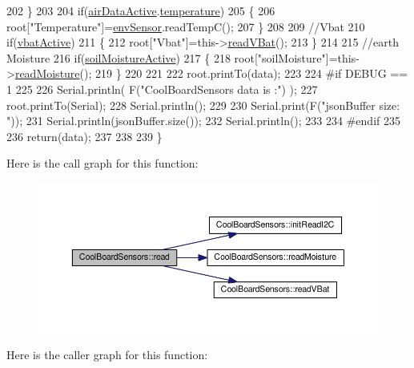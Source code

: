 \begin{DoxyCode}
202     \}   
203     
204     \textcolor{keywordflow}{if}(\hyperlink{classCoolBoardSensors_abff8dfeccb2f7689847bb64d5f1cd31e}{airDataActive}.\hyperlink{structCoolBoardSensors_1_1airActive_a9a6633c426b0508e30ebc1832ec6d745}{temperature})
205     \{
206         root[\textcolor{stringliteral}{"Temperature"}]=\hyperlink{classCoolBoardSensors_a868e38985e9a2412829fa2790ca13e2e}{envSensor}.readTempC();
207     \}
208     
209     \textcolor{comment}{//Vbat}
210     \textcolor{keywordflow}{if}(\hyperlink{classCoolBoardSensors_af5039ad760b0ff0aa7eee16c55e81702}{vbatActive})    
211     \{   
212         root[\textcolor{stringliteral}{"Vbat"}]=this->\hyperlink{classCoolBoardSensors_a6944b6ea7bce8e2fce1b434acfd9d5f3}{readVBat}();
213     \}
214     
215     \textcolor{comment}{//earth Moisture}
216     \textcolor{keywordflow}{if}(\hyperlink{classCoolBoardSensors_a31983eecc0f9cd000e1f912206ea4dc8}{soilMoistureActive})
217     \{   
218         root[\textcolor{stringliteral}{"soilMoisture"}]=this->\hyperlink{classCoolBoardSensors_a8761bff50373c485f4465c8db47d0633}{readMoisture}();
219     \}
220     
221     
222     root.printTo(data);
223 
224 \textcolor{preprocessor}{#if DEBUG == 1}
225 
226     Serial.println( F(\textcolor{stringliteral}{"CoolBoardSensors data is :"}) );
227     root.printTo(Serial);
228     Serial.println();
229     
230     Serial.print(F(\textcolor{stringliteral}{"jsonBuffer size: "}));
231     Serial.println(jsonBuffer.size());
232     Serial.println();
233 
234 \textcolor{preprocessor}{#endif}
235 
236     \textcolor{keywordflow}{return}(data);   
237     
238 
239 \}
\end{DoxyCode}
Here is the call graph for this function\+:\nopagebreak
\begin{figure}[H]
\begin{center}
\leavevmode
\includegraphics[width=350pt]{classCoolBoardSensors_a91badb2539d91fda8679f2a597874c48_cgraph}
\end{center}
\end{figure}
Here is the caller graph for this function\+:\nopagebreak
